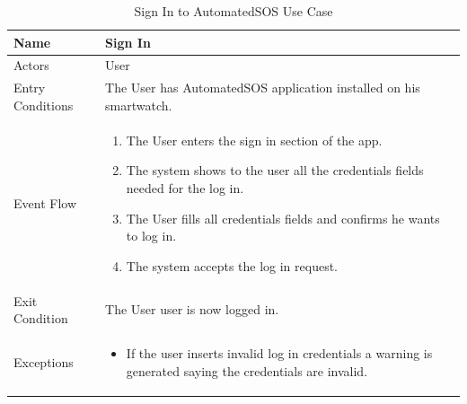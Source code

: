 \begin{enumerate}
\FloatBarrier
\begin{table}[h]
\begin{tabular}{|p{3.4cm}|p{}|}
\hline
Name             & Sign In \\ \hline
Actors           & User  \\ \hline
Entry Conditions & The User has AutomatedSOS application installed on his smartwatch.    \\ \hline
Event Flow       & \begin{enumerate}
			\item The User enters the sign in section of the app.
            \item The system shows to the user all the credentials fields needed for the log in.
            \item The User fills all credentials fields and confirms he wants to log in.             
            \item The system accepts the log in request.
        \end{enumerate}\\ \hline
Exit Condition   & The User user is now logged in.\\ \hline
Exceptions       & \begin{itemize}
\item If the user inserts invalid log in credentials a warning is generated saying the credentials are invalid.
\end{itemize}\\ \hline
\end{tabular}
\caption{Sign In to AutomatedSOS Use Case}
\end{table}
\FloatBarrier


\end{enumerate}
